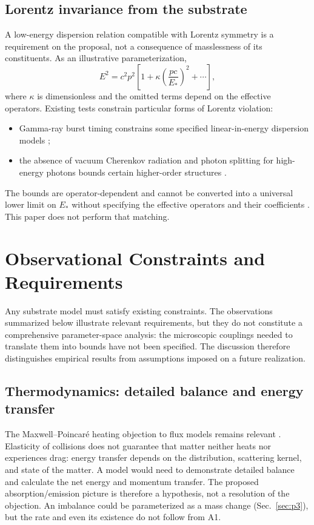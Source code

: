 \documentclass[11pt,a4paper]{article}
\begin{document}
\subsection{Lorentz invariance from the substrate}

A low-energy dispersion relation compatible with Lorentz symmetry is a requirement on the
proposal, not a consequence of masslessness of its constituents. As an illustrative
parameterization,
\begin{equation}
E^2 = c^2p^2\left[1+\kappa\left(\frac{pc}{E_\ast}\right)^2+\cdots\right],
\end{equation}
where $\kappa$ is dimensionless and the omitted terms depend on the effective operators. Existing
tests constrain particular forms of Lorentz violation:
\begin{itemize}
\item Gamma-ray burst timing constrains some specified linear-in-energy dispersion models
\cite{Abdo2009,Vasileiou2013};
\item the absence of vacuum Cherenkov radiation and photon splitting for high-energy photons
bounds certain higher-order structures \cite{Jacobson2003}.
\end{itemize}
The bounds are operator-dependent and cannot be converted into a universal lower limit on
$E_\ast$ without specifying the effective operators and their coefficients
\cite{Myers2005,Bolokhov2007}. This paper does not perform that matching.

\section{Observational Constraints and Requirements}\label{sec:exp}

Any substrate model must satisfy existing constraints. The observations summarized below
illustrate relevant requirements, but they do not constitute a comprehensive parameter-space
analysis: the microscopic couplings needed to translate them into bounds have not been specified.
The discussion therefore distinguishes empirical results from assumptions imposed on a future
realization.

\subsection{Thermodynamics: detailed balance and energy transfer}\label{sec:heat}

The Maxwell--Poincar\'e heating objection to flux models remains relevant
\cite{LeSage2002,Poincare1908}. Elasticity of collisions does not guarantee that matter neither
heats nor experiences drag: energy transfer depends on the distribution, scattering kernel, and
state of the matter. A model would need to demonstrate detailed balance and calculate the net
energy and momentum transfer. The proposed absorption/emission picture is therefore a hypothesis,
not a resolution of the objection. An imbalance could be parameterized as a mass change
(Sec.~\ref{sec:p3}), but the rate and even its existence do not follow from A1.
\end{document}
